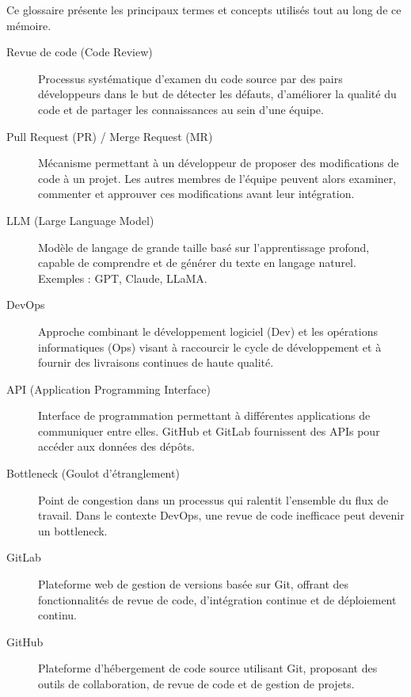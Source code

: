 
Ce glossaire présente les principaux termes et concepts utilisés tout au long de ce mémoire.

\vspace{1em}

\begin{description}
    \item[Revue de code (Code Review)] Processus systématique d'examen du code source par des pairs développeurs dans le but de détecter les défauts, d'améliorer la qualité du code et de partager les connaissances au sein d'une équipe.
    
    \item[Pull Request (PR) / Merge Request (MR)] Mécanisme permettant à un développeur de proposer des modifications de code à un projet. Les autres membres de l'équipe peuvent alors examiner, commenter et approuver ces modifications avant leur intégration.
    
    \item[LLM (Large Language Model)] Modèle de langage de grande taille basé sur l'apprentissage profond, capable de comprendre et de générer du texte en langage naturel. Exemples : GPT, Claude, LLaMA.
    
    \item[DevOps] Approche combinant le développement logiciel (Dev) et les opérations informatiques (Ops) visant à raccourcir le cycle de développement et à fournir des livraisons continues de haute qualité.
    
    \item[API (Application Programming Interface)] Interface de programmation permettant à différentes applications de communiquer entre elles. GitHub et GitLab fournissent des APIs pour accéder aux données des dépôts.
    
    \item[Bottleneck (Goulot d'étranglement)] Point de congestion dans un processus qui ralentit l'ensemble du flux de travail. Dans le contexte DevOps, une revue de code inefficace peut devenir un bottleneck.
    
    \item[GitLab] Plateforme web de gestion de versions basée sur Git, offrant des fonctionnalités de revue de code, d'intégration continue et de déploiement continu.
    
    \item[GitHub] Plateforme d'hébergement de code source utilisant Git, proposant des outils de collaboration, de revue de code et de gestion de projets.
    

\end{description}
